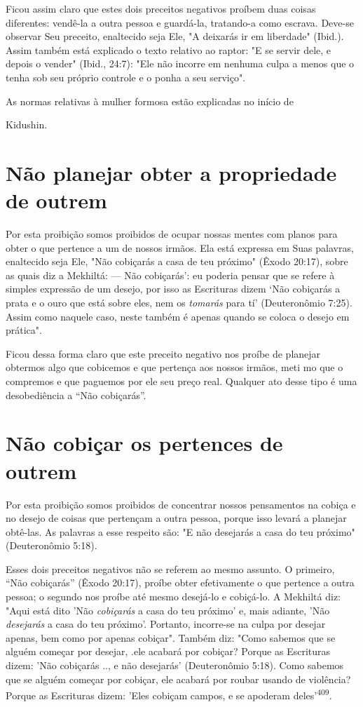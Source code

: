 Ficou assim claro que estes dois preceitos negativos proíbem duas coisas
diferentes: vendê-la a outra pessoa e guardá-la, tratando-a como
escrava. Deve-se observar Seu preceito, enaltecido seja Ele, "A deixarás
ir em liberda­de" (Ibid.). Assim também está explicado o texto relativo
ao raptor: "E se ser­vir dele, e depois o vender" (Ibid., 24:7): "Ele
não incorre em nenhuma culpa a menos que o tenha sob seu próprio
controle e o ponha a seu serviço".


As normas relativas à mulher formosa estão explicadas no início de


Kidushin.

\section{Não planejar obter a propriedade de outrem}

Por esta proibição somos proibidos de ocupar nossas mentes com planos
para obter o que pertence a um de nossos irmãos. Ela está expressa em
Suas palavras, enaltecido seja Ele, "Não cobiçarás a casa de teu
próximo" (Êxo­do 20:17), sobre as quais diz a Mekhiltá:
--- Não cobiçarás': eu poderia pensar que se refere à
simples expressão de um desejo, por isso as Escrituras dizem `Não
cobiçarás a prata e o ouro que está sobre eles, nem os \emph{tomarás}
para tí' (Deuteronômio 7:25). Assim como naquele caso, neste também é
apenas quan­do se coloca o desejo em prática".

Ficou dessa forma claro que este preceito negativo nos proíbe de
planejar obtermos algo que cobicemos e que pertença aos nossos irmãos,
meti mo que o compremos e que paguemos por ele seu preço real. Qualquer
ato desse tipo é uma desobediência a ``Não cobiçarás''.

\section{Não cobiçar os pertences de outrem}

Por esta proibição somos proibidos de concentrar nossos pensamen­tos na
cobiça e no desejo de coisas que pertençam a outra pessoa, porque isso
levará a planejar obtê-las. As palavras a esse respeito são: "E não
desejarás a casa do teu próximo" (Deuteronômio 5:18).

Esses dois preceitos negativos não se referem ao mesmo assunto. O
primeiro, ``Não cobiçarás'' (Êxodo 20:17), proíbe obter efetivamente o que
per­tence a outra pessoa; o segundo nos proíbe até mesmo desejá-lo e
cobiçá-lo. A Mekhiltá diz: "Aqui está dito 'Não \emph{cobiçarás} a casa
do teu próximo' e, mais adiante, 'Não \emph{desejarás} a casa do teu
próximo'. Portanto, incorre-se na culpa por desejar apenas, bem como por
apenas cobiçar". Também diz: "Como sa­bemos que se alguém começar por
desejar, .ele acabará por cobiçar? Porque as Escrituras dizem: 'Não
cobiçarás .., e não desejarás' (Deuteronômio 5:18). Como sabemos que se
alguém começar por cobiçar, ele acabará por roubar usan­do de violência?
Porque as Escrituras dizem: 'Eles cobiçam campos, e se apo­deram
deles'\textsuperscript{409}.

